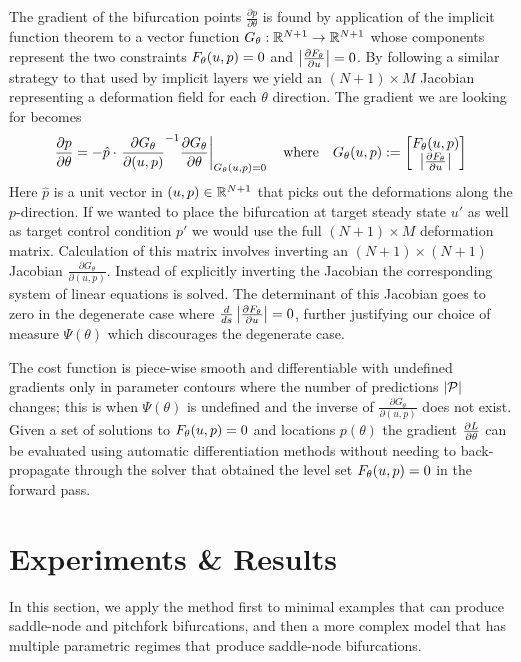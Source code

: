 The gradient of the bifurcation points $\frac{\partial p}{\partial\theta}$ is found by application of the implicit function theorem to a vector function $G_{\theta}:\mathbb{R}^{N+1}\rightarrow\mathbb{R}^{N+1}$ whose components represent the two constraints $F_{\theta}(u,p)=0$ and $\left| \frac{\partial F_{\theta}}{\partial u} \right|=0$. By following a similar strategy to that used by implicit layers \cite{Look2020DifferentiableLayers} we yield an $(N+1)\times M$ Jacobian representing a deformation field \cite{Jos2011OnSurface} for each $\theta$ direction. The gradient we are looking for becomes
\begin{align}
    \frac{\partial p}{\partial\theta} = -\hat{p}\cdot\left.\frac{\partial G_{\theta}}{\partial (u,p)}^{-1}
    \frac{\partial  G_{\theta}}{\partial\theta}\right|_{G_{\theta}(u,p)=0}
    \quad\mathrm{where}\quad
    G_{\theta}(u,p):=\begin{bmatrix}F_{\theta}(u,p)\\\left| \frac{\partial F_{\theta}}{\partial u} \right|\end{bmatrix}
    \label{eq:gradient-bifurcation}
\end{align}
Here $\hat{p}$ is a unit vector in $(u,p)\in\mathbb{R}^{N+1}$ that picks out the deformations along the $p$-direction. If we wanted to place the bifurcation at target steady state $u'$ as well as target control condition $p'$ we would use the full $(N+1)\times M$ deformation matrix. Calculation of this matrix involves inverting an $(N+1)\times(N+1)$ Jacobian $\frac{\partial G_{\theta}}{\partial(u,p)}$. Instead of explicitly inverting the Jacobian the corresponding system of linear equations is solved. The determinant of this Jacobian goes to zero in the degenerate case where $\frac{d}{ds}\left| \frac{\partial F_{\theta}}{\partial u} \right|=0$, further justifying our choice of measure $\Psi(\theta)$ which discourages the degenerate case.

The cost function is piece-wise smooth and differentiable with undefined gradients only in parameter contours where the number of predictions $|\mathcal{P}|$ changes; this is when $\Psi(\theta)$ is undefined and the inverse of $\frac{\partial G_{\theta}}{\partial (u,p)}$ does not exist. Given a set of solutions to $F_{\theta}(u,p)=0$ and locations $p(\theta)$ the gradient $\frac{\partial L}{\partial\theta}$ can be evaluated using automatic differentiation methods \cite{Revels2016Forward-ModeJulia,Innes2018FashionableFlux,Innes2018Flux:Julia} without needing to back-propagate through the solver that obtained the level set $F_{\theta}(u,p)=0$ in the forward pass.

\section{Experiments \& Results}
\label{section:results}
In this section, we apply the method first to minimal examples that can produce saddle-node and pitchfork bifurcations, and then a more complex model that has multiple parametric regimes that produce saddle-node bifurcations.

